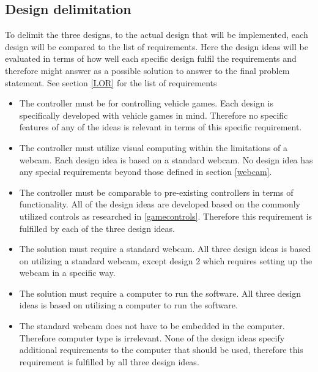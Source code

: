 \subsection{Design delimitation}

To delimit the three designs, to the actual design that will be implemented, each design will be compared to the list of requirements. Here the design ideas will be evaluated in terms of how well each specific design fulfil the requirements and therefore might answer as a possible solution to answer to the final problem statement. See section \ref{LOR} for the list of requirements

\begin{itemize}
\item The controller must be for controlling vehicle games.\newline
Each design is specifically developed with vehicle games in mind. Therefore no specific features of any of the ideas is relevant in terms of this specific requirement.

\item The controller must utilize visual computing within the limitations of a webcam.\newline
Each design idea is based on a standard webcam. No design idea has any special requirements beyond those defined in section \ref{webcam}. 

\item The controller must be comparable to pre-existing controllers in terms of functionality.\newline
All of the design ideas are developed based on the commonly utilized controls as researched in \ref{gamecontrols}. Therefore this requirement is fulfilled by each of the three design ideas.

\item The solution must require a standard webcam.\newline
All three design ideas is based on utilizing a standard webcam, except design 2 which requires setting up the webcam in a specific way.

\item The solution must require a computer to run the software.\newline
All three design ideas is based on utilizing a computer to run the software.

\item The standard webcam does not have to be embedded in the computer. Therefore computer type is irrelevant.\newline
None of the design ideas specify additional requirements to the computer that should be used, therefore this requirement is fulfilled by all three design ideas.


\end{itemize}

